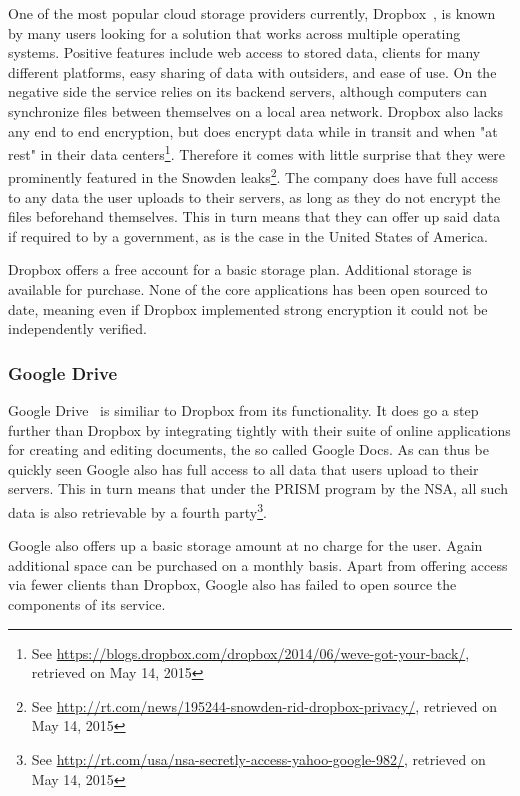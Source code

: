 One of the most popular cloud storage providers currently, Dropbox~\cite{web:site:dropbox}, is known by many users looking for a solution that works across multiple operating systems.
Positive features include web access to stored data, clients for many different platforms, easy sharing of data with outsiders, and ease of use.
On the negative side the service relies on its backend servers, although computers can synchronize files between themselves on a local area network.
Dropbox also lacks any end to end encryption, but does encrypt data while in transit and when "at rest" in their data centers\footnote{See \url{https://blogs.dropbox.com/dropbox/2014/06/weve-got-your-back/}, retrieved on May 14, 2015}.
Therefore it comes with little surprise that they were prominently featured in the Snowden leaks\footnote{See \url{http://rt.com/news/195244-snowden-rid-dropbox-privacy/}, retrieved on May 14, 2015}.
The company does have full access to any data the user uploads to their servers, as long as they do not encrypt the files beforehand themselves.
This in turn means that they can offer up said data if required to by a government, as is the case in the United States of America.

Dropbox offers a free account for a basic storage plan.
Additional storage is available for purchase.
None of the core applications has been open sourced to date, meaning even if Dropbox implemented strong encryption it could not be independently verified.

\subsubsection{Google Drive}

Google Drive~\cite{web:site:gdrive} is similiar to Dropbox from its functionality.
It does go a step further than Dropbox by integrating tightly with their suite of online applications for creating and editing documents, the so called Google Docs.
As can thus be quickly seen Google also has full access to all data that users upload to their servers.
This in turn means that under the PRISM program by the NSA, all such data is also retrievable by a fourth party\footnote{See \url{http://rt.com/usa/nsa-secretly-access-yahoo-google-982/}, retrieved on May 14, 2015}.

Google also offers up a basic storage amount at no charge for the user.
Again additional space can be purchased on a monthly basis.
Apart from offering access via fewer clients than Dropbox, Google also has failed to open source the components of its service.

